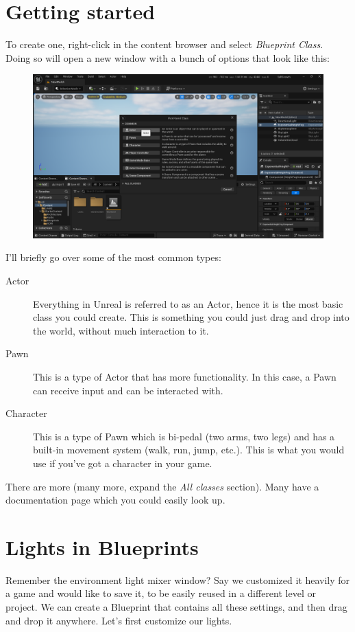 \documentclass{article}
\begin{document}
\section{Getting started}
To create one, right-click in the content browser and select \emph{Blueprint Class}. Doing so will open a new window with a bunch of options that look like this:

\begin{figure}[h]
\centering
\includegraphics*[width=\textwidth]{day3images/image.png}
\end{figure}

I'll briefly go over some of the most common types:

\begin{description}
    \item[Actor] Everything in Unreal is referred to as an Actor, hence it is the most basic class you could create. This is something you could just drag and drop into the world, without much interaction to it.
    \item[Pawn] This is a type of Actor that has more functionality. In this case, a Pawn can receive input and can be interacted with.
    \item[Character] This is a type of Pawn which is bi-pedal (two arms, two legs) and has a built-in movement system (walk, run, jump, etc.). This is what you would use if you've got a character in your game.  
\end{description}
There are more (many more, expand the \emph{All classes} section). Many have a documentation page which you could easily look up.

\section{Lights in Blueprints}
Remember the environment light mixer window? Say we customized it heavily for a game and would like to save it, to be easily reused in a different level or project. We can create a Blueprint that contains all these settings, and then drag and drop it anywhere. Let's first customize our lights.
\end{document}
